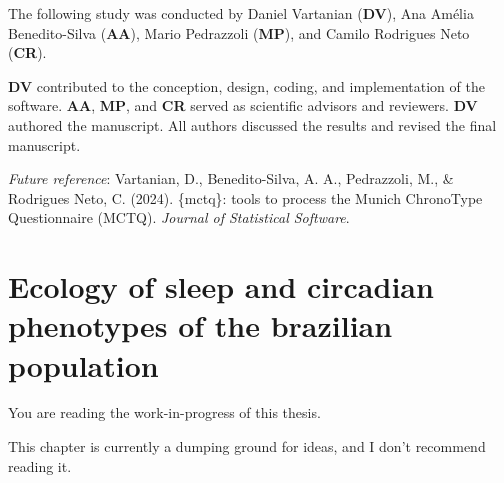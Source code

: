 \documentclass[
12pt,
openright,
oneside,
a4paper,
chapter=TITLE,
section=TITLE,
french,
spanish,
brazil,
english
]{abntex2}\usepackage{array}
\newcommand{\microskip}{\vspace{\microskipamount}}
\begin{document}
\begin{tcolorbox}[enhanced jigsaw, colframe=quarto-callout-note-color-frame, coltitle=black, opacityback=0, left=2mm, opacitybacktitle=0.6, rightrule=.15mm, leftrule=.75mm, colbacktitle=quarto-callout-note-color!10!white, titlerule=0mm, title=\textcolor{quarto-callout-note-color}{\faInfo}\hspace{0.5em}{Note}, colback=white, breakable, bottomtitle=1mm, toptitle=1mm, arc=.35mm, bottomrule=.15mm, toprule=.15mm]

The following study was conducted by Daniel Vartanian (\textbf{DV}), Ana
Amélia Benedito-Silva (\textbf{AA}), Mario Pedrazzoli (\textbf{MP}), and
Camilo Rodrigues Neto (\textbf{CR}).

\microskip

\textbf{DV} contributed to the conception, design, coding, and
implementation of the software. \textbf{AA}, \textbf{MP}, and
\textbf{CR} served as scientific advisors and reviewers. \textbf{DV}
authored the manuscript. All authors discussed the results and revised
the final manuscript.

\microskip

\emph{Future reference}: Vartanian, D., Benedito-Silva, A. A.,
Pedrazzoli, M., \& Rodrigues Neto, C. (2024). \{mctq\}: tools to process
the Munich ChronoType Questionnaire (MCTQ). \emph{Journal of Statistical
Software}.

\end{tcolorbox}


\chapter{Ecology of sleep and circadian phenotypes of the brazilian
population}\label{ecology-of-sleep-and-circadian-phenotypes-of-the-brazilian-population}

\begin{tcolorbox}[enhanced jigsaw, colframe=quarto-callout-important-color-frame, coltitle=black, opacityback=0, left=2mm, opacitybacktitle=0.6, rightrule=.15mm, leftrule=.75mm, colbacktitle=quarto-callout-important-color!10!white, titlerule=0mm, title=\textcolor{quarto-callout-important-color}{\faExclamation}\hspace{0.5em}{Important}, colback=white, breakable, bottomtitle=1mm, toptitle=1mm, arc=.35mm, bottomrule=.15mm, toprule=.15mm]

You are reading the work-in-progress of this thesis.

\microskip

This chapter is currently a dumping ground for ideas, and I don't
recommend reading it.

\end{tcolorbox}
\end{document}

